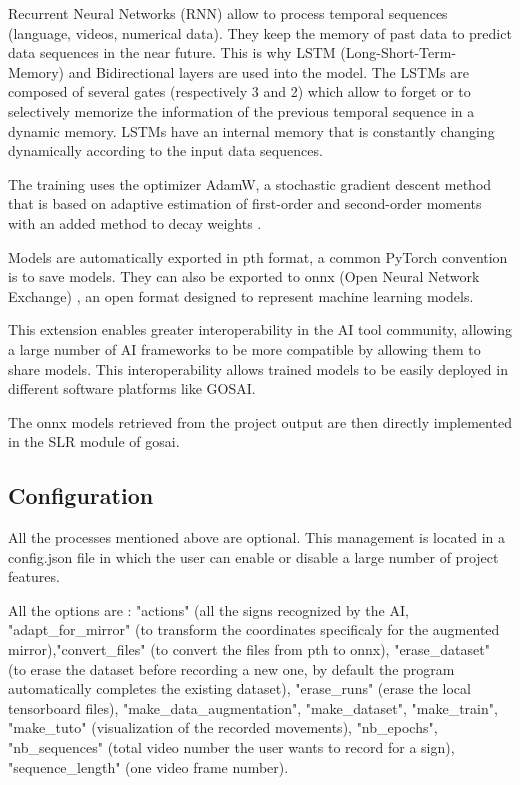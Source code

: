 Recurrent Neural Networks (RNN) allow to process temporal sequences (language, videos, numerical data). They keep the memory of past data to predict data sequences in the near future. 
This is why LSTM (Long-Short-Term-Memory) and Bidirectional layers are used into the model. 
The LSTMs are composed of several gates (respectively 3 and 2) which allow to forget or to selectively memorize the information of the previous temporal sequence in a dynamic memory.
LSTMs have an internal memory that is constantly changing dynamically according to the input data sequences.

The training uses the optimizer AdamW, a stochastic gradient descent method that is based on adaptive estimation of first-order and second-order moments with an added method to decay weights \cite{loshchilov2017decoupled}. 

Models are automatically exported in pth format, a common PyTorch convention is to save models. They can also be exported to onnx (Open Neural Network Exchange) \cite{onnx}, an open format designed to represent machine learning models.

This extension enables greater interoperability in the AI tool community, allowing a large number of AI frameworks to be more compatible by allowing them to share models. This interoperability allows trained models to be easily deployed in different software platforms like GOSAI.

The onnx models retrieved from the project output are then directly implemented in the SLR module of gosai.


\subsection{Configuration}

All the processes mentioned above are optional. This management is located in a config.json file in which the user can enable or disable a large number of project features. 

All the options are : "actions" (all the signs recognized by the AI, "adapt\_for\_mirror" (to transform the coordinates specificaly for the augmented mirror),"convert\_files" (to convert the files from pth to onnx), "erase\_dataset" (to erase the dataset before recording a new one, by default the program automatically completes the existing dataset), "erase\_runs" (erase the local tensorboard files), "make\_data\_augmentation", "make\_dataset", "make\_train", "make\_tuto"  (visualization of the recorded movements), "nb\_epochs", "nb\_sequences" (total video number the user wants to record for a sign), "sequence\_length" (one video frame number).

